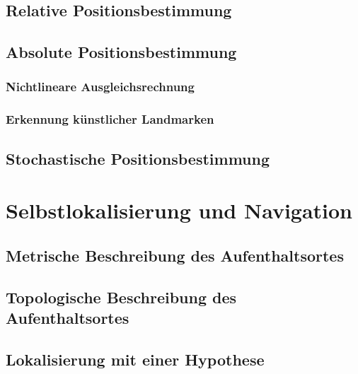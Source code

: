 \documentclass[a4paper, 11pt, accentcolor = tud3b]{tudreport}
\begin{document}
			\subsection{Relative Positionsbestimmung} %

			\subsection{Absolute Positionsbestimmung} %

				\subsubsection{Nichtlineare Ausgleichsrechnung} %

				\subsubsection{Erkennung künstlicher Landmarken} %

			\subsection{Stochastische Positionsbestimmung} %

		\section{Selbstlokalisierung und Navigation} %

			\subsection{Metrische Beschreibung des Aufenthaltsortes} %

			\subsection{Topologische Beschreibung des Aufenthaltsortes} %

			\subsection{Lokalisierung mit einer Hypothese} %
\end{document}
